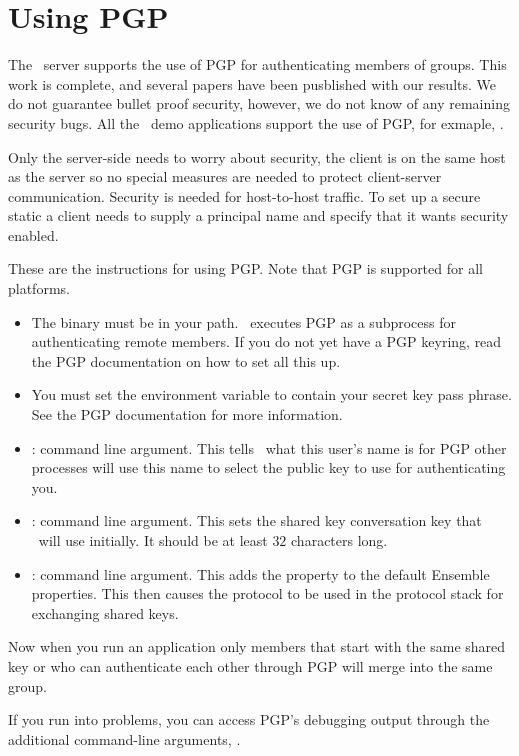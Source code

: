 \section{Using PGP}

The \ensemble\ server supports the use of PGP for authenticating members of
groups.  This work is complete, and several papers have been
pusblished with our results. We do not guarantee bullet proof
security, however, we do not know of any remaining security bugs.
All the \ensemble\ demo applications support the use of PGP, for
exmaple, . 

Only the server-side needs to worry about security, the client is on
the same host as the server so no special measures are needed to
protect client-server communication. Security is needed for
host-to-host traffic. To set up a secure static a client needs to
supply a principal name and specify that it wants security enabled. 

These are the instructions for using PGP. Note that PGP is 
supported for all platforms.

\begin{itemize}
\item
The  binary must be in your path.  \ensemble\ executes PGP
as a subprocess for authenticating remote members.  If you do not yet
have a PGP keyring, read the PGP documentation on how to set all this
up.
\item
You must set the  environment variable to contain your
secret key pass phrase.  See the PGP documentation for more
information.
\item
{} : command line argument.  This tells \ensemble\ what
this user's name is for PGP other processes will use this name to
select the public key to use for authenticating you.
\item
{}: command line argument.  This sets the shared
key conversation key that \ensemble\ will use initially.  It should
be at least $32$ characters long.
\item
{}: command line argument.  This adds the
 property to the default Ensemble properties.  This then
causes the  protocol to be used in the protocol stack
for exchanging shared keys.
\end{itemize}

Now when you run an application only members that start with the same
shared key or who can authenticate each other through PGP will
merge into the same group.

If you run into problems, you can access PGP's debugging output
through the additional command-line arguments, .
